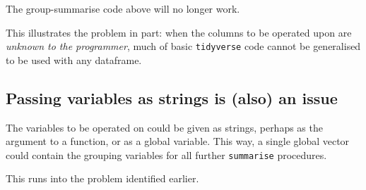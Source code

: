 \documentclass[]{book}
\newenvironment{Shaded}{}{}
\newcommand{\CommentTok}[1]{\textcolor[rgb]{0.38,0.63,0.69}{\textit{#1}}}
\newcommand{\DataTypeTok}[1]{\textcolor[rgb]{0.56,0.13,0.00}{#1}}
\newcommand{\FloatTok}[1]{\textcolor[rgb]{0.25,0.63,0.44}{#1}}
\newcommand{\KeywordTok}[1]{\textcolor[rgb]{0.00,0.44,0.13}{\textbf{#1}}}
\newcommand{\NormalTok}[1]{#1}
\newcommand{\OperatorTok}[1]{\textcolor[rgb]{0.40,0.40,0.40}{#1}}
\newcommand{\StringTok}[1]{\textcolor[rgb]{0.25,0.44,0.63}{#1}}
\begin{document}
The group-summarise code above will no longer work.

\begin{Shaded}
\end{Shaded}

This illustrates the problem in part: when the columns to be operated upon are \emph{unknown to the programmer}, much of basic \texttt{tidyverse} code cannot be generalised to be used with any dataframe.

\hypertarget{passing-variables-as-strings-is-also-an-issue}{%
\subsection{Passing variables as strings is (also) an issue}\label{passing-variables-as-strings-is-also-an-issue}}

The variables to be operated on could be given as strings, perhaps as the argument to a function, or as a global variable. This way, a single global vector could contain the grouping variables for all further \texttt{summarise} procedures.

This runs into the problem identified earlier.
\end{document}
